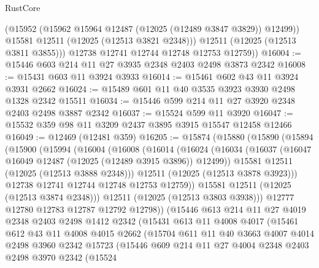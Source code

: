 \begin{lexlean}{RustCore}
\begin{coremodule}
            (@15952 (@15962 @15964 @12487 (@12025 (@12489 @3847 @3829)) @12499))
            @15581
            @12511
            (@12025 (@12513 @3821 @2348)))
          @12511
          (@12025 (@12513 @3811 @3855)))
        @12738
        @12741
        @12744
        @12748
        @12753
        @12759))
@16004 := @15446 @603 @214 @11 @27 @3935 @2348 @2403 @2498 @3873 @2342
@16008 := @15431 @603 @11 @3924 @3933
@16014 := @15461 @602 @43 @11 @3924 @3931 @2662
@16024 := @15489 @601 @11 @40 @3535 @3923 @3930 @2498 @1328 @2342 @15511
@16034 := @15446 @599 @214 @11 @27 @3920 @2348 @2403 @2498 @3887 @2342
@16037 := @15524 @599 @11 @3920
@16047 := @15532 @359 @98 @11 @3209 @2437 @3895 @3915 @15547 @12458 @12466
@16049 := @12469 (@12481 @359)
@16205 := @15874
    (@15880
      (@15890
        (@15894
          (@15900
            (@15994
              (@16004
                (@16008
                  (@16014
                    (@16024
                      (@16034
                        (@16037 (@16047 @16049 @12487 (@12025 (@12489 @3915 @3896)) @12499))
                        @15581
                        @12511
                        (@12025 (@12513 @3888 @2348)))
                      @12511
                      (@12025 (@12513 @3878 @3923)))
                    @12738
                    @12741
                    @12744
                    @12748
                    @12753
                    @12759))
                @15581
                @12511
                (@12025 (@12513 @3874 @2348)))
              @12511
              (@12025 (@12513 @3803 @3938)))
            @12777
            @12780
            @12783
            @12787
            @12792
            @12798))
        (@15446
          @613
          @214
          @11
          @27
          @4019
          @2348
          @2403
          @2498
          @1412
          @2342
          (@15431
            @613
            @11
            @4008
            @4017
            (@15461
              @612
              @43
              @11
              @4008
              @4015
              @2662
              (@15704
                @611
                @11
                @40
                @3663
                @4007
                @4014
                @2498
                @3960
                @2342
                @15723
                (@15446
                  @609
                  @214
                  @11
                  @27
                  @4004
                  @2348
                  @2403
                  @2498
                  @3970
                  @2342
                  (@15524

\end{coremodule}
\end{lexlean}
